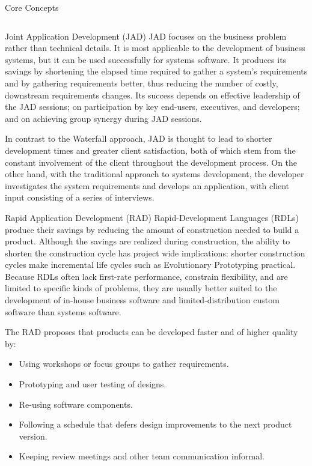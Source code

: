 \documentclass[final,hyperref={pdfpagelabels=false}]{beamer}
\begin{document}
\begin{frame}{Core Concepts}
\begin{columns}[t]
\begin{column}{.48\linewidth}
\begin{block}{Joint Application Development (JAD)}
            JAD focuses on the business problem rather than technical details. It is most applicable to the development of business systems, but it can be used successfully for systems software. It produces its savings by shortening the elapsed time required to gather a system's requirements and by gathering requirements better, thus reducing the number of costly, downstream requirements changes. Its success depends on effective leadership of the JAD sessions; on participation by key end-users, executives, and developers; and on achieving group synergy during JAD sessions.
             
            In contrast to the Waterfall approach, JAD is thought to lead to shorter development times and greater client satisfaction, both of which stem from the constant involvement of the client throughout the development process. On the other hand, with the traditional approach to systems development, the developer investigates the system requirements and develops an application, with client input consisting of a series of interviews.
             

        \end{block}
        \begin{block}{Rapid Application Development (RAD)}
           Rapid-Development Languages (RDLs) produce their savings by reducing the amount of construction needed to build a product. Although the savings are realized during construction, the ability to shorten the construction cycle has project wide implications: shorter construction cycles make incremental life cycles such as Evolutionary Prototyping practical. Because RDLs often lack first-rate performance, constrain flexibility, and are limited to specific kinds of problems, they are usually better suited to the development of in-house business software and limited-distribution custom software than systems software.
 
            The RAD proposes that products can be developed faster and of higher quality by:
            \begin{itemize}
                \item Using workshops or focus groups to gather requirements.
                \item Prototyping and user testing of designs.
                \item Re-using software components.
                \item Following a schedule that defers design improvements to the next product version.
                \item Keeping review meetings and other team communication informal.
            \end{itemize}
            


\end{block}
\end{column}
\end{columns}
\end{frame}
\end{document}
